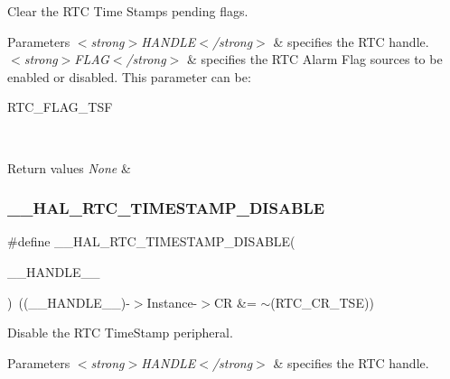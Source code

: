 Clear the R\+TC Time Stamp\textquotesingle{}s pending flags. 


\begin{DoxyParams}{Parameters}
{\em $<$strong$>$\+H\+A\+N\+D\+L\+E$<$/strong$>$} & specifies the R\+TC handle. \\
\hline
{\em $<$strong$>$\+F\+L\+A\+G$<$/strong$>$} & specifies the R\+TC Alarm Flag sources to be enabled or disabled. This parameter can be\+: \begin{DoxyItemize}
\item R\+T\+C\+\_\+\+F\+L\+A\+G\+\_\+\+T\+SF \end{DoxyItemize}
\\
\hline
\end{DoxyParams}

\begin{DoxyRetVals}{Return values}
{\em None} & \\
\hline
\end{DoxyRetVals}
\mbox{\label{group___r_t_c_ex___timestamp_ga7281d85b199bee5eb74cc135208051fa}} 
\subsubsection{\texorpdfstring{\+\_\+\+\_\+\+H\+A\+L\+\_\+\+R\+T\+C\+\_\+\+T\+I\+M\+E\+S\+T\+A\+M\+P\+\_\+\+D\+I\+S\+A\+B\+LE}{\_\_HAL\_RTC\_TIMESTAMP\_DISABLE}}
{\footnotesize\ttfamily \#define \+\_\+\+\_\+\+H\+A\+L\+\_\+\+R\+T\+C\+\_\+\+T\+I\+M\+E\+S\+T\+A\+M\+P\+\_\+\+D\+I\+S\+A\+B\+LE(\begin{DoxyParamCaption}\item[{}]{\+\_\+\+\_\+\+H\+A\+N\+D\+L\+E\+\_\+\+\_\+ }\end{DoxyParamCaption})~((\+\_\+\+\_\+\+H\+A\+N\+D\+L\+E\+\_\+\+\_\+)-\/$>$Instance-\/$>$CR \&= $\sim$(R\+T\+C\+\_\+\+C\+R\+\_\+\+T\+SE))}



Disable the R\+TC Time\+Stamp peripheral. 


\begin{DoxyParams}{Parameters}
{\em $<$strong$>$\+H\+A\+N\+D\+L\+E$<$/strong$>$} & specifies the R\+TC handle. \\
\hline
\end{DoxyParams}

